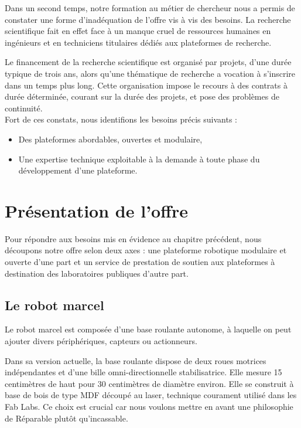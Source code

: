 \documentclass[a4paper,12pt]{report}
\begin{document}
Dans un second temps, notre formation au métier de chercheur nous a permis de constater une forme d'inadéquation de l'offre vis à vis des besoins.
La recherche scientifique fait en effet face à un manque cruel de ressources humaines en ingénieurs et en techniciens titulaires dédiés aux plateformes de recherche.

Le financement de la recherche scientifique est organisé par projets, d'une durée typique de trois ans, alors qu'une thématique de recherche a vocation à s'inscrire dans un temps plus long.
Cette organisation impose le recours à des contrats à durée déterminée, courant sur la durée des projets, et pose des problèmes de continuité.\\

Fort de ces constats, nous identifions les besoins précis suivants :
\begin{itemize}
	\item Des plateformes abordables, ouvertes et modulaire,
	\item Une expertise technique exploitable à la demande à toute phase du développement d'une plateforme.
\end{itemize}

\section{Présentation de l'offre}
Pour répondre aux besoins mis en évidence au chapitre précédent, nous découpons notre offre selon deux axes :
une plateforme robotique modulaire et ouverte d'une part et un service de prestation de soutien aux plateformes à destination des laboratoires publiques d'autre part.
\subsection{Le robot marcel}
Le robot marcel est composée d'une base roulante autonome, à laquelle on peut ajouter divers périphériques, capteurs ou actionneurs.

Dans sa version actuelle, la base roulante dispose de deux roues motrices indépendantes et d'une bille omni-directionnelle stabilisatrice.
Elle mesure 15 centimètres de haut pour 30 centimètres de diamètre environ.
Elle se construit à base de bois de type MDF découpé au laser, technique courament utilisé dans les Fab Labs.
Ce choix est crucial car nous voulons mettre en avant une philosophie de \og{}Réparable plutôt qu'incassable\fg{}.
\end{document}
